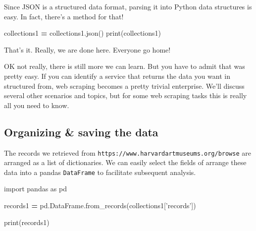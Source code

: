 \documentclass[
]{book}
\newenvironment{Shaded}{\begin{snugshade}}{\end{snugshade}}
\newcommand{\BuiltInTok}[1]{#1}
\newcommand{\ImportTok}[1]{#1}
\newcommand{\NormalTok}[1]{#1}
\newcommand{\OperatorTok}[1]{\textcolor[rgb]{0.81,0.36,0.00}{\textbf{#1}}}
\newcommand{\StringTok}[1]{\textcolor[rgb]{0.31,0.60,0.02}{#1}}
\begin{document}
Since JSON is a structured data format, parsing it into Python data
structures is easy. In fact, there's a method for that!

\begin{Shaded}
\begin{Highlighting}[]
\NormalTok{collections1 }\OperatorTok{=}\NormalTok{ collections1.json()}
\BuiltInTok{print}\NormalTok{(collections1)}
\end{Highlighting}
\end{Shaded}

That's it. Really, we are done here. Everyone go home!

OK not really, there is still more we can learn. But you have to admit
that was pretty easy. If you can identify a service that returns the
data you want in structured from, web scraping becomes a pretty
trivial enterprise. We'll discuss several other scenarios and topics,
but for some web scraping tasks this is really all you need to know.

\hypertarget{organizing-saving-the-data}{%
\subsection{Organizing \& saving the data}\label{organizing-saving-the-data}}

The records we retrieved from
\texttt{https://www.harvardartmuseums.org/browse} are arranged as a list of
dictionaries. We can easily select the fields of arrange these data
into a pandas \texttt{DataFrame} to facilitate subsequent analysis.

\begin{Shaded}
\begin{Highlighting}[]
\ImportTok{import}\NormalTok{ pandas }\ImportTok{as}\NormalTok{ pd}
\end{Highlighting}
\end{Shaded}

\begin{Shaded}
\begin{Highlighting}[]
\NormalTok{records1 }\OperatorTok{=}\NormalTok{ pd.DataFrame.from_records(collections1[}\StringTok{'records'}\NormalTok{])}
\end{Highlighting}
\end{Shaded}

\begin{Shaded}
\begin{Highlighting}[]
\BuiltInTok{print}\NormalTok{(records1)}
\end{Highlighting}
\end{Shaded}
\end{document}
